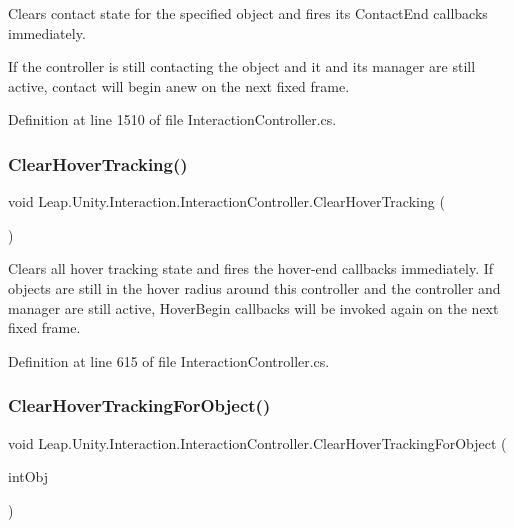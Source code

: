 Clears contact state for the specified object and fires its Contact\+End callbacks immediately. 

If the controller is still contacting the object and it and its manager are still active, contact will begin anew on the next fixed frame. 

Definition at line 1510 of file Interaction\+Controller.\+cs.

\mbox{\label{class_leap_1_1_unity_1_1_interaction_1_1_interaction_controller_a01f1951bc78ef7b3362df72bfbff4613}} 
\subsubsection{\texorpdfstring{ClearHoverTracking()}{ClearHoverTracking()}}
{\footnotesize\ttfamily void Leap.\+Unity.\+Interaction.\+Interaction\+Controller.\+Clear\+Hover\+Tracking (\begin{DoxyParamCaption}{ }\end{DoxyParamCaption})}



Clears all hover tracking state and fires the hover-\/end callbacks immediately. If objects are still in the hover radius around this controller and the controller and manager are still active, Hover\+Begin callbacks will be invoked again on the next fixed frame. 



Definition at line 615 of file Interaction\+Controller.\+cs.

\mbox{\label{class_leap_1_1_unity_1_1_interaction_1_1_interaction_controller_a9de6995d8a1409d6ac9ea3520eb7d0c4}} 
\subsubsection{\texorpdfstring{ClearHoverTrackingForObject()}{ClearHoverTrackingForObject()}}
{\footnotesize\ttfamily void Leap.\+Unity.\+Interaction.\+Interaction\+Controller.\+Clear\+Hover\+Tracking\+For\+Object (\begin{DoxyParamCaption}\item[{\mbox{\hyperlink{interface_leap_1_1_unity_1_1_interaction_1_1_i_interaction_behaviour}{I\+Interaction\+Behaviour}}}]{int\+Obj }\end{DoxyParamCaption})}



